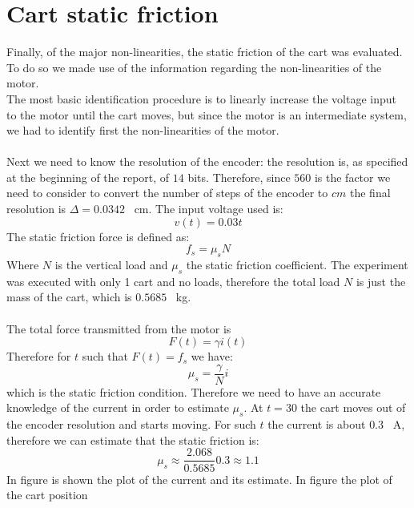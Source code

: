 \section{Cart static friction}
Finally, of the major non-linearities, the static friction of the cart was evaluated. To do so we made use of the information regarding the non-linearities of the motor. \\
The most basic identification procedure is to linearly increase the voltage input to the motor until the cart moves, but since the motor is an intermediate system, we had to identify first the non-linearities of the motor.\\ \\
Next we need to know the resolution of the encoder: the resolution is, as specified at the beginning of the report, of $14$ bits. Therefore, since $560$ is the factor we need to consider to convert the number of steps of the encoder to $cm$ the final resolution is $\Delta = 0.0342$ \SI{}{\centi \metre}. The input voltage used is:
\begin{equation}
v(t) = 0.03t
\end{equation}
The static friction force is defined as:
\begin{equation}
f_s = \mu_s  N
\end{equation}
Where $N$ is the vertical load and $\mu_s$ the static friction coefficient. The experiment was executed with only 1 cart and no loads, therefore the total load $N$ is just the mass of the cart, which is $0.5685$ \SI{}{\kilo \gram}.\\ \\
The total force transmitted from the motor is \begin{equation}
F(t) = \gamma i(t)
\end{equation}
Therefore for $t$ such that $F(t)=f_s$ we have:
\begin{equation}
\mu_s = \frac{\gamma}{N} i
\end{equation}
which is the static friction condition. Therefore we need to have an accurate knowledge of the current in order to estimate $\mu_s$. 
At $t=30$ the cart moves out of the encoder resolution and starts moving. For such $t$ the current is about $0.3$ \SI{}{\ampere}, therefore we can estimate that the static friction is:
\begin{equation}
\mu_s \approx \frac{2.068}{0.5685}0.3 \approx 1.1
\end{equation}
In figure is shown the plot of the current and its estimate. In figure the plot of the cart position

